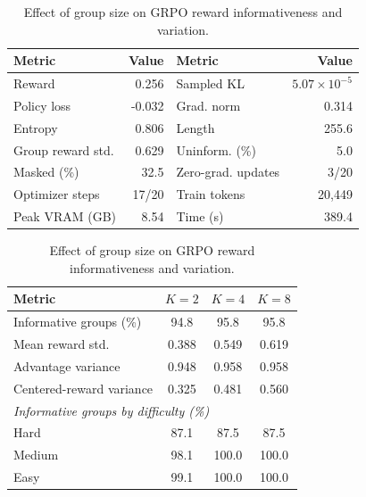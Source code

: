 \documentclass{article}
\begin{document}
\begin{table}[t]
\centering
\begin{minipage}[b]{0.53\linewidth}
\caption{Standard GRPO continuation ($K=4$),
averaged over 20 scheduled updates.}
\label{tab:grpo_standard}
\end{minipage}\hfill
\begin{minipage}[b]{0.43\linewidth}
\caption{Effect of group size on GRPO reward informativeness
and variation.}
\label{tab:grpo_group}
\end{minipage}

\begin{minipage}[t]{0.53\linewidth}\centering
\scriptsize
\setlength{\tabcolsep}{2pt}
\begin{tabular*}{\linewidth}{@{\extracolsep{\fill}}lr@{\hspace{10pt}}lr}
\toprule
Metric & Value & Metric & Value \\
\midrule
Reward & 0.256 & Sampled KL & $5.07{\times}10^{-5}$ \\
Policy loss & -0.032 & Grad. norm & 0.314 \\
Entropy & 0.806 & Length & 255.6 \\
Group reward std. & 0.629 & Uninform. (\%) & 5.0 \\
Masked (\%) & 32.5 & Zero-grad. updates & 3/20 \\
Optimizer steps & 17/20 & Train tokens & 20,449 \\
Peak VRAM (GB) & 8.54 & Time (s) & 389.4 \\
\bottomrule
\end{tabular*}
\end{minipage}\hfill
\begin{minipage}[t]{0.43\linewidth}\centering
\scriptsize
\setlength{\tabcolsep}{2pt}
\begin{tabular*}{\linewidth}{@{\extracolsep{\fill}}lccc}
\toprule
Metric & $K=2$ & $K=4$ & $K=8$ \\
\midrule
Informative groups (\%) & 94.8 & 95.8 & 95.8 \\
Mean reward std. & 0.388 & 0.549 & 0.619 \\
Advantage variance & 0.948 & 0.958 & 0.958 \\
Centered-reward variance & 0.325 & 0.481 & 0.560 \\
\midrule
\multicolumn{4}{l}{\textit{Informative groups by difficulty (\%)}} \\
Hard & 87.1 & 87.5 & 87.5 \\
Medium & 98.1 & 100.0 & 100.0 \\
Easy & 99.1 & 100.0 & 100.0 \\
\bottomrule
\end{tabular*}
\end{minipage}
\vspace{-2mm}
\end{table}
\end{document}
